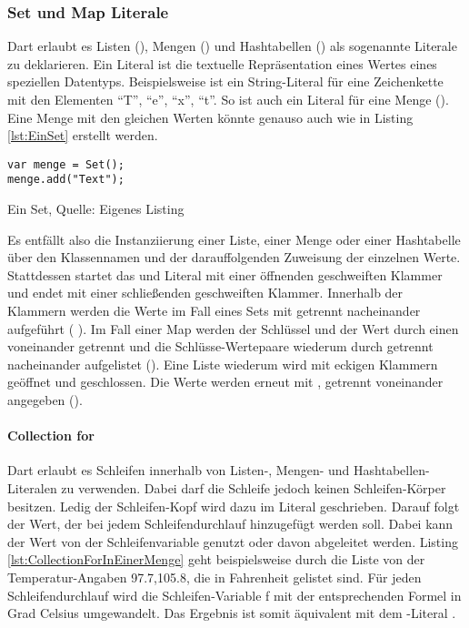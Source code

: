 \subsubsection{Set und Map Literale}

Dart erlaubt es Listen (), Mengen () und Hashtabellen () als sogenannte Literale zu deklarieren. Ein Literal ist die textuelle Repräsentation eines Wertes eines speziellen Datentyps. Beispielsweise ist   ein String-Literal für eine Zeichenkette mit den Elementen \enquote{T}, \enquote{e}, \enquote{x}, \enquote{t}. So ist auch   ein Literal für eine Menge (). Eine Menge mit den gleichen Werten könnte genauso auch wie in Listing \ref{lst:EinSet} erstellt werden.

\ifincludeall
  \begin{listing}[ht]
    \begin{verbatim}
var menge = Set();
menge.add("Text");
\end{verbatim}
    \caption[Ein Set]{Ein Set, Quelle: Eigenes Listing}
    \label{lst:EinSet}
  \end{listing}
\fi

Es entfällt also die Instanziierung einer Liste, einer Menge oder einer Hashtabelle über den Klassennamen und der darauffolgenden Zuweisung der einzelnen Werte. Stattdessen startet das  und  Literal mit einer öffnenden geschweiften Klammer und endet mit einer schließenden geschweiften Klammer. Innerhalb der Klammern werden die Werte im Fall eines Sets mit \IC{,} getrennt nacheinander aufgeführt (  ). Im Fall einer Map werden der Schlüssel und der Wert durch einen \IC{:} voneinander getrennt und die Schlüsse-Wertepaare wiederum durch \IC{,} getrennt nacheinander aufgelistet (). Eine Liste wiederum wird mit eckigen Klammern geöffnet und geschlossen. Die Werte werden erneut mit , getrennt voneinander angegeben (\IC{[1,2]}).

\paragraph{Collection for} Dart erlaubt es Schleifen innerhalb von Listen-, Mengen- und Hashtabellen-Literalen zu verwenden. Dabei darf die Schleife jedoch keinen Schleifen-Körper besitzen. Ledig der Schleifen-Kopf wird dazu im Literal geschrieben. Darauf folgt der Wert, der bei jedem Schleifendurchlauf hinzugefügt werden soll. Dabei kann der Wert von der Schleifenvariable genutzt oder davon abgeleitet werden.
Listing \ref{lst:CollectionForInEinerMenge} geht beispielsweise durch die Liste von der Temperatur-Angaben 97.7,105.8, die in Fahrenheit gelistet sind. Für jeden Schleifendurchlauf wird die Schleifen-Variable f mit der entsprechenden Formel in Grad Celsius umgewandelt. Das Ergebnis ist somit äquivalent mit dem -Literal .


